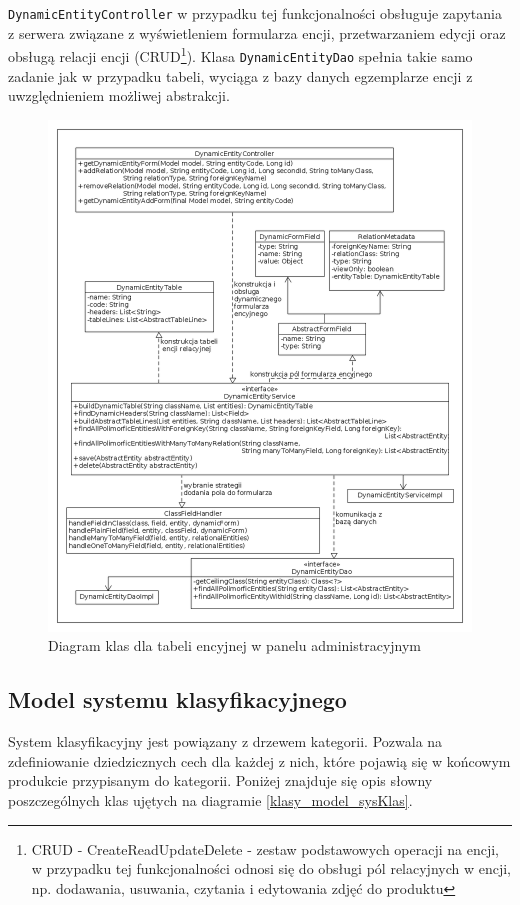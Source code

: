 \texttt{DynamicEntityController} w przypadku tej funkcjonalności obsługuje zapytania z serwera związane z wyświetleniem formularza encji, przetwarzaniem edycji oraz obsługą relacji encji (CRUD\footnote{CRUD - CreateReadUpdateDelete - zestaw podstawowych operacji na encji, w przypadku tej funkcjonalności odnosi się do obsługi pól relacyjnych w encji, np. dodawania, usuwania, czytania i edytowania zdjęć do produktu }). Klasa \texttt{DynamicEntityDao} spełnia takie samo zadanie jak w przypadku tabeli, wyciąga z bazy danych egzemplarze encji z uwzględnieniem możliwej abstrakcji.
\begin{figure}
	\begin{center}
		\includegraphics[scale=0.4]{klasy_formularz_encyjny.png}
	\end{center}
	\caption{{\color{black}Diagram klas dla tabeli encyjnej w panelu administracyjnym}} \label{klasy_formularz_encyjny}
\end{figure}

\subsection{Model systemu klasyfikacyjnego}
System klasyfikacyjny jest powiązany z drzewem kategorii. Pozwala na zdefiniowanie dziedzicznych cech dla każdej z nich, które pojawią się w końcowym produkcie przypisanym do kategorii. Poniżej znajduje się opis słowny poszczególnych klas ujętych na diagramie \ref{klasy_model_sysKlas}.

